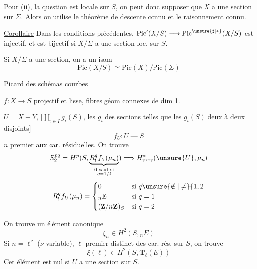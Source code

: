 Pour (ii),  la question est locale sur $S$, on peut donc supposer que $X$ a une section sur $\Sigma$. Alors on utilise le théorème de descente connu et le raisonnement connu.

\uline{Corollaire}  Dans les conditions précédentes, $\mathrm{Pic}'(X/S)\longrightarrow\mathrm{Pic}^{\unsure{\sharp|*}}(X/S)$ est injectif, et est bijectif si $X/\Sigma$  a une section loc. sur $S$.

Si $X/\Sigma$ a \unsure{=} une section, on a un isom
\[
\mathrm{Pic}(X/S)\simeq\mathrm{Pic}(X)/\mathrm{Pic}(\Sigma)
\]

Picard des schémas  courbes

$f:X\longrightarrow S$ projectif et lisse, fibres géom connexes de dim 1.

$U=X-Y$,  $[\coprod_{i\in I}g_i(S)$, les $g_i$ des sections telles que les $g_i(S)$ deux à deux disjoints$]$
\[
f_U:U\mathbin{\text{---}}S
\]
$n$ premier aux car. résiduelles. On trouve
\[
E_2^{pq}=H^p(S,\underbrace{R^q_!f_U(\mu_n)}_{\substack{0\text{ sauf si}\\q=1,2}})\Longrightarrow H^*_{\mathrm{prop}}(\unsure{U},\mu_n)
\]
\[
R^q_!f_U(\mu_n)=\begin{cases}
0&\text{si }q\unsure{\notin|\ne}\{1,2\\
{}_n\mathbf E&\text{si }q=1\\
(\mathbf Z/n\mathbf Z)_S&\text{si }q=2
\end{cases}
\]

On trouve un élément canonique
\[
\xi_n\in H^2(S,{}_n E)
\]
Si $n=\ell^\nu$ ($\nu$ variable), $\ell$ premier distinct des car. rés. sur $S$, on trouve
\[
\boxed{\xi(\ell)\in H^2(S,\mathbf T_\ell(E))}
\]
Cet \uline{élément est nul si} $U$ \uline{a une section sur} $S$.

